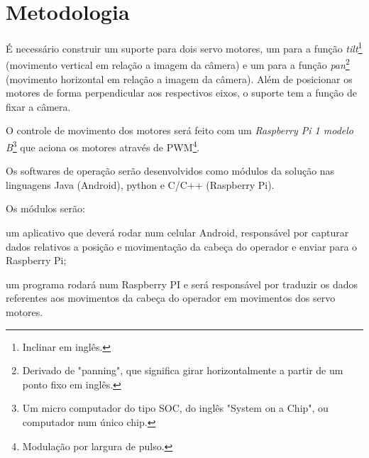\documentclass[12pt,a4paper]{article}
\begin{document}
\section{Metodologia}
	É necessário construir um suporte para dois servo motores, um para a função \emph{tilt}\footnote{Inclinar em inglês.} (movimento vertical em relação a imagem da câmera) e um para a função \emph{pan}\footnote{Derivado de "panning", que significa girar horizontalmente a partir de um ponto fixo em inglês.} (movimento horizontal em relação a imagem da câmera). Além de posicionar os motores de forma perpendicular aos respectivos eixos, o suporte tem a função de fixar a câmera.\par
	O controle de movimento dos motores será feito com um \emph{Raspberry Pi 1 modelo B}\footnote{Um micro computador do tipo SOC, do inglês "System on a Chip", ou computador num único chip.} que aciona os motores através de PWM\footnote{Modulação por largura de pulso.}.\par
	Os softwares de operação serão desenvolvidos como módulos da solução nas linguagens Java (Android), python e C/C++ (Raspberry Pi).\par
	Os módulos serão: \begin{enumerate*} \item um aplicativo que deverá rodar num celular Android, responsável por capturar dados relativos a posição e movimentação da cabeça do operador e enviar para o Raspberry Pi; \item um programa rodará num Raspberry PI e será responsável por traduzir os dados referentes aos movimentos da cabeça do operador em movimentos dos servo motores.\end{enumerate*}\par
\end{document}
